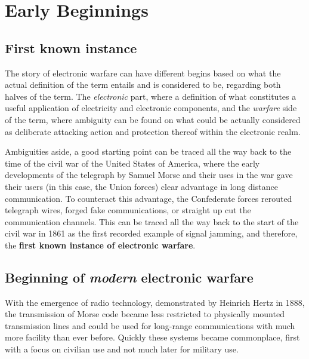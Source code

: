 \documentclass[english,purist]{ist-report}
\begin{document}
\section{Early Beginnings} 

\subsection{First known instance}

The story of electronic warfare can have different begins based on what the actual definition of the term entails and is considered to be, regarding both halves of the term. The \emph{electronic} part, where a definition of what constitutes a useful application of electricity and electronic components, and the \emph{warfare} side of the term, where ambiguity can be found on what could be actually considered as deliberate attacking action and protection thereof within the electronic realm.

Ambiguities aside, a good starting point can be traced all the way back to the time of the civil war of the United States of America, where the early developments of the telegraph by Samuel Morse and their uses in the war gave their users (in this case, the Union forces) clear advantage in long distance communication\footnotemark. To counteract this advantage, the Confederate forces rerouted telegraph wires, forged fake communications, or straight up cut the communication channels. This can be traced all the way back to the start of the civil war in 1861 as the first recorded example of signal jamming, and therefore, the \textbf{first known instance of electronic warfare}.

\subsection{Beginning of \textit{modern} electronic warfare}

With the emergence of radio technology, demonstrated by Heinrich Hertz in 1888, the transmission of Morse code became less restricted to physically mounted transmission lines and could be used for long-range communications with much more facility than ever before. Quickly these systems became commonplace, first with a focus on civilian use and not much later for military use.
\end{document}
